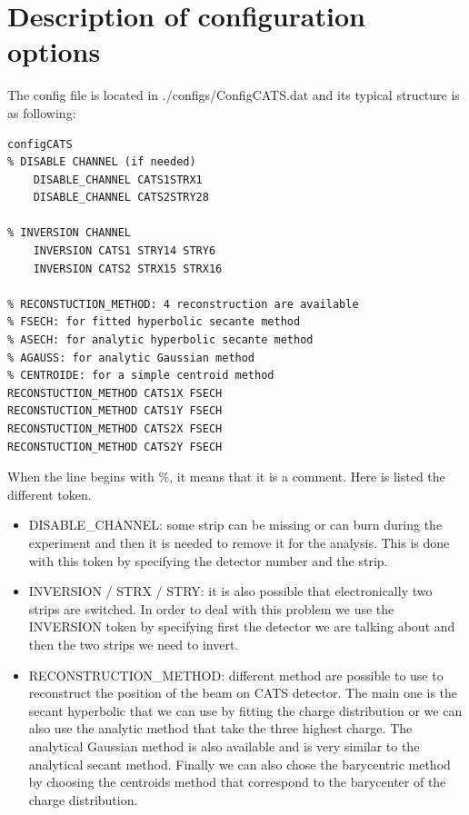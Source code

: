 \documentclass[a4paper,12pt]{article}
\begin{document}
\section{Description of configuration options}
The config file is located in ./configs/ConfigCATS.dat and its typical structure is as following:
\begin{verbatim}
configCATS
% DISABLE CHANNEL (if needed)
	DISABLE_CHANNEL CATS1STRX1
	DISABLE_CHANNEL CATS2STRY28

% INVERSION CHANNEL
	INVERSION CATS1 STRY14 STRY6
	INVERSION CATS2 STRX15 STRX16
	
% RECONSTUCTION_METHOD: 4 reconstruction are available
% FSECH: for fitted hyperbolic secante method 
% ASECH: for analytic hyperbolic secante method
% AGAUSS: for analytic Gaussian method
% CENTROIDE: for a simple centroid method
RECONSTUCTION_METHOD CATS1X FSECH
RECONSTUCTION_METHOD CATS1Y FSECH
RECONSTUCTION_METHOD CATS2X FSECH
RECONSTUCTION_METHOD CATS2Y FSECH
\end{verbatim}
When the line begins with \%, it means that it is a comment. Here is listed the different token.
\begin{itemize}
   \item DISABLE\_CHANNEL: some strip can be missing or can burn during the experiment and then it is needed to remove it for the analysis. This is done with this token by specifying the detector number and the strip.
   \item INVERSION / STRX / STRY: it is also possible that electronically two strips are switched. In order to deal with this problem we use the INVERSION token by specifying first the detector we are talking about and then the two strips we need to invert.
   \item RECONSTRUCTION\_METHOD: different method are possible to use to reconstruct the position of the beam on CATS detector. The main one is the secant hyperbolic that we can use by fitting the charge distribution or we can also use the analytic method that take the three highest charge. The analytical Gaussian method is also available and is very similar to the analytical secant method. Finally we can also chose the barycentric method by choosing the centroids method that correspond to the barycenter of the charge distribution.
\end{itemize}
\end{document}
